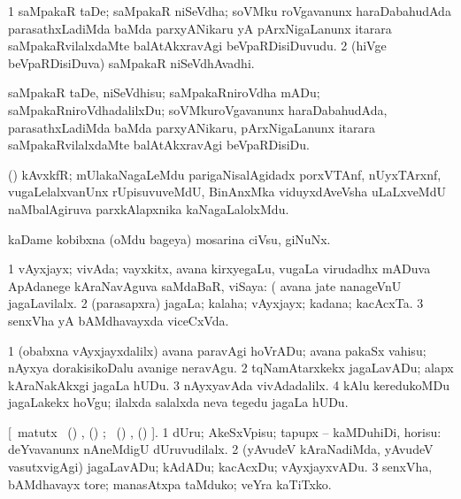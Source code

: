 \bentry
{}
\gl{\nA}
\bmng
\bnum
\num{1} saMpakaR taDe; saMpakaR niSeVdha; soVMku roVgavanunx haraDabahudAda parasathxLadiMda baMda parxyANikaru yA pArxNigaLanunx itarara saMpakaRvilalxdaMte balAtAkxra\-vAgi beVpaRDisiDuvudu. 
\num{2} (hiVge beVpaRDisiDuva) saMpakaR niSeVdhAvadhi. 
\enum
\emng
\eentry

\bentry
{}
\gl{\sakirx}
\bmng
saMpakaR taDe, niSeVdhisu; saMpakaRniroVdha mADu; saMpakaRniroVdhadalilxDu; soVMkuroVgavanunx haraDabahudAda, parasathxLadiMda baMda parxyANikaru, pArxNigaLanunx itarara saMpakaRvilalxdaMte balAtAkxravAgi beVpaRDisiDu. 
\emng
\eentry

\bentry
{}
\gl{\nA}
\bmng
(\Bwvi) kAvxkfR; mUlakaNagaLeMdu parigaNisalAgidadx porxVTAnf, nUyxTArxnf, \mo vugaLelalxvanUnx rUpisuvuveMdU, BinAnxMka viduyxdAveVsha uLaLxveMdU naMbalAgiruva parxkAlapxnika kaNagaLalolxMdu. 
\emng
\eentry

\bentry
{}
\gl{\nA}
\bmng
kaDame kobibxna (oMdu bageya) mosarina ciVsu, giNuNx. 
\emng
\eentry

\bentry
{}
\gl{\nA}
\bmng
\bnum
\num{1} vAyxjayx; vivAda; vayxkitx, avana kirxyegaLu, \mo vugaLa virudadhx mADuva ApAdanege kAraNavAguva saMdaBaR, viSaya:  (  avana jate nanageVnU jagaLavilalx. 
\num{2} (parasapxra) jagaLa; kalaha; vAyxjayx; kadana; kacAcxTa. 
\num{3} senxVha yA bAMdhavayxda viceCxVda. 
\enum
\emng

\noindent
\gl{\pagu}
\bmng
\bnum
\num{1}   (obabxna vAyxjayxdalilx) avana paravAgi hoVrADu; avana pakaSx vahisu; nAyxya dorakisikoDalu avanige neravAgu. 
\num{2}    tqNamAtarxkekx jagaLavADu; alapx kAraNakAkxgi jagaLa hUDu. 
\num{3}   nAyxyavAda vivAdadalilx. 
\num{4}    kAlu keredukoMDu jagaLakekx hoVgu; ilalxda salalxda neva tegedu jagaLa hUDu. 
\enum
\emng
\eentry

\bentry
{}
\gl{\akirx}
[\BU\ matutx \BUkaq\ (\birx) , (\ame) ; 
\vakaq\ (\birx) , (\ame) ].\bmng
\bnum
\num{1} dUru; AkeSxVpisu; tapupx -- kaMDuhiDi, horisu:    deYvavanunx nAneMdigU dUruvudilalx. 
\num{2} (yAvudeV kAraNadiMda, yAvudeV vasutxvigAgi) jagaLavADu; kAdADu; kacAcxDu; vAyxjayxvADu. 
\num{3} senxVha, bAMdhavayx tore; manasAtxpa taMduko; veYra kaTiTxko. 
\enum
\emng
\eentry

